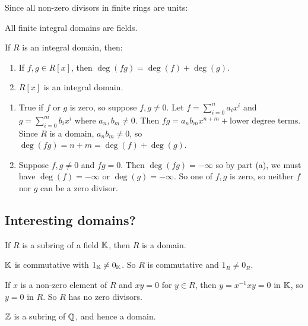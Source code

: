 \documentclass[12pt,letterpaper]{report}
\begin{document}
Since all non-zero divisors in finite rings are units:

\begin{cor}{}{}
  All finite integral domains are fields.
\end{cor}

\begin{prop}{}{}
  If $R$ is an integral domain, then:
  \begin{enumerate}
    \item If $f, g \in R[x]$, then $\deg(fg) = \deg(f) + \deg(g)$.
    \item $R[x]$ is an integral domain.
  \end{enumerate}
\end{prop}

\begin{thmproof}
  \begin{enumerate}
    \item True if $f$ or $g$ is zero, so suppose $f, g \neq 0$.
    Let $f = \sum_{i = 0}^n a_i x^i$ and $g = \sum_{i = 0}^m b_i x^i$ where $a_n, b_m \neq 0$.
    Then $fg = a_n b_m x^{n + m} + \text{lower degree terms}$.
    Since $R$ is a domain, $a_n b_m \neq 0$, so $\deg(fg) = n + m = \deg(f) + \deg(g)$.
    \item Suppose $f, g \neq 0$ and $fg = 0$.
    Then $\deg(fg) = -\infty$ so by part (a), we must have $\deg(f) = -\infty$ or
    $\deg(g) = -\infty$.
    So one of $f, g$ is zero, so neither $f$ nor $g$ can be a zero divisor.
  \end{enumerate}
\end{thmproof}

\pagebreak
\subsection{Interesting domains?}

\begin{prop}{}{}
  If $R$ is a subring of a field $\mathbb{K}$, then $R$ is a domain.
\end{prop}

\begin{thmproof}
  $\mathbb{K}$ is commutative with $1_{\mathbb{K}} \neq 0_{\mathbb{K}}$.
  So $R$ is commutative and $1_R \neq 0_R$.

  If $x$ is a non-zero element of $R$ and $xy = 0$ for $y \in R$, then $y = x^{-1}xy = 0$ in
  $\mathbb{K}$, so $y = 0$ in $R$.
  So $R$ has no zero divisors.
\end{thmproof}

\begin{ex}
  $\mathbb{Z}$ is a subring of $\mathbb{Q}$, and hence a domain.
\end{ex}
\end{document}
